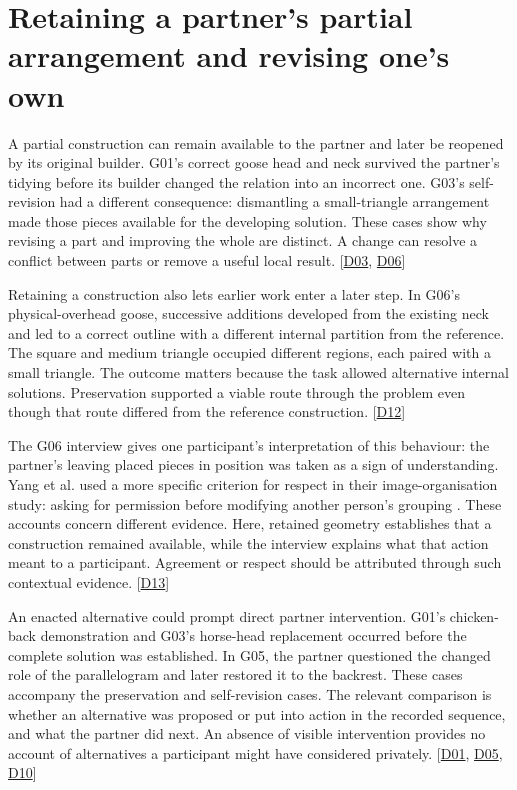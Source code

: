 \section{Retaining a partner's partial arrangement and revising one's own}\label{sec:6-3}

A partial construction can remain available to the partner and later be reopened by its original builder. G01's correct goose head and neck survived the partner's tidying before its builder changed the relation into an incorrect one. G03's self-revision had a different consequence: dismantling a small-triangle arrangement made those pieces available for the developing solution. These cases show why revising a part and improving the whole are distinct. A change can resolve a conflict between parts or remove a useful local result. [\hyperlink{src:D03}{D03}, \hyperlink{src:D06}{D06}]

Retaining a construction also lets earlier work enter a later step. In G06's physical-overhead goose, successive additions developed from the existing neck and led to a correct outline with a different internal partition from the reference. The square and medium triangle occupied different regions, each paired with a small triangle. The outcome matters because the task allowed alternative internal solutions. Preservation supported a viable route through the problem even though that route differed from the reference construction. [\hyperlink{src:D12}{D12}]

The G06 interview gives one participant's interpretation of this behaviour: the partner's leaving placed pieces in position was taken as a sign of understanding. Yang et al. used a more specific criterion for respect in their image-organisation study: asking for permission before modifying another person's grouping \cite{yang2022}. These accounts concern different evidence. Here, retained geometry establishes that a construction remained available, while the interview explains what that action meant to a participant. Agreement or respect should be attributed through such contextual evidence. [\hyperlink{src:D13}{D13}]

An enacted alternative could prompt direct partner intervention. G01's chicken-back demonstration and G03's horse-head replacement occurred before the complete solution was established. In G05, the partner questioned the changed role of the parallelogram and later restored it to the backrest. These cases accompany the preservation and self-revision cases. The relevant comparison is whether an alternative was proposed or put into action in the recorded sequence, and what the partner did next. An absence of visible intervention provides no account of alternatives a participant might have considered privately. [\hyperlink{src:D01}{D01}, \hyperlink{src:D05}{D05}, \hyperlink{src:D10}{D10}]


